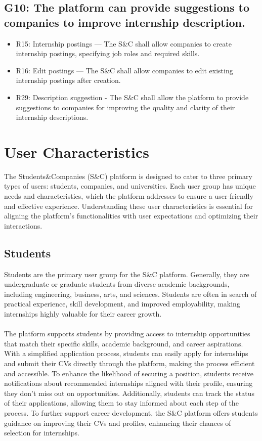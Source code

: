 \subsection{G10: The platform can provide suggestions to companies to improve internship description.}
\begin{itemize}
    \item R15: Internship postings — The S\&C shall allow companies to create internship postings, specifying job roles and required skills.
    \item R16: Edit postings — The S\&C shall allow companies to edit existing internship postings after creation.
    \item R29: Description suggestion - The S\&C shall allow the platform to provide suggestions to companies for improving the quality and clarity of their internship descriptions.
\end{itemize}

\section{User Characteristics}

The Students\&Companies (S\&C) platform is designed to cater to three primary types of users: students, companies, and universities. Each user group has unique needs and characteristics, which the platform addresses to ensure a user-friendly and effective experience. Understanding these user characteristics is essential for aligning the platform’s functionalities with user expectations and optimizing their interactions.

\subsection{Students}
Students are the primary user group for the S\&C platform. Generally, they are undergraduate or graduate students from diverse academic backgrounds, including engineering, business, arts, and sciences. Students are often in search of practical experience, skill development, and improved employability, making internships highly valuable for their career growth. \\ \\
The platform supports students by providing access to internship opportunities that match their specific skills, academic background, and career aspirations. With a simplified application process, students can easily apply for internships and submit their CVs directly through the platform, making the process efficient and accessible. To enhance the likelihood of securing a position, students receive notifications about recommended internships aligned with their profile, ensuring they don’t miss out on opportunities. Additionally, students can track the status of their applications, allowing them to stay informed about each step of the process. To further support career development, the S\&C platform offers students guidance on improving their CVs and profiles, enhancing their chances of selection for internships.

